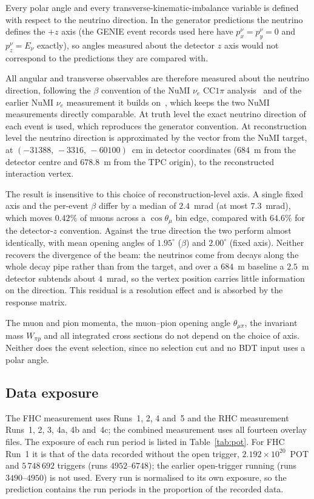 \documentclass[11pt,a4paper]{article}
\begin{document}
Every polar angle and every transverse-kinematic-imbalance variable is defined with respect to the
neutrino direction. In the generator predictions the neutrino defines the $+z$ axis (the GENIE
event records used here have $p_x^\nu=p_y^\nu=0$ and $p_z^\nu=E_\nu$ exactly), so angles measured
about the detector $z$ axis would not correspond to the predictions they are compared with.

All angular and transverse observables are therefore measured about the neutrino direction,
following the $\beta$ convention of the NuMI $\nu_e$ CC$1\pi$ analysis~\cite{numi_nue_ccpi} and of
the earlier NuMI $\nu_e$ measurement it builds on~\cite{mistry_thesis}, which keeps the two NuMI
measurements directly comparable. At truth level the exact neutrino direction of each event is
used, which reproduces the generator convention. At reconstruction level the neutrino direction is
approximated by the vector from the NuMI target, at $(-31388,\,-3316,\,-60100)$~cm in detector
coordinates ($684$~m from the detector centre and $678.8$~m from the TPC origin), to the
reconstructed interaction vertex.

The result is insensitive to this choice of reconstruction-level axis. A single fixed axis and the
per-event $\beta$ differ by a median of $2.4$~mrad (at most $7.3$~mrad), which moves $0.42\%$ of
muons across a $\cos\theta_\mu$ bin edge, compared with $64.6\%$ for the detector-$z$ convention.
Against the true direction the two perform almost identically, with mean opening angles of
$1.95^\circ$ ($\beta$) and $2.00^\circ$ (fixed axis). Neither recovers the divergence of the beam:
the neutrinos come from decays along the whole decay pipe rather than from the target, and over a
$684$~m baseline a $2.5$~m detector subtends about $4$~mrad, so the vertex position carries little
information on the direction. This residual is a resolution effect and is absorbed by the response
matrix.

The muon and pion momenta, the muon--pion opening angle $\theta_{\mu\pi}$, the invariant mass
$W_{\pi p}$ and all integrated cross sections do not depend on the choice of axis. Neither does the
event selection, since no selection cut and no BDT input uses a polar angle.

\subsection{Data exposure}

The FHC measurement uses Runs~1, 2, 4 and~5 and the RHC measurement Runs~1, 2, 3, 4a, 4b and~4c;
the combined measurement uses all fourteen overlay files. The exposure of each run period is listed
in Table~\ref{tab:pot}. For FHC Run~1 it is that of the data recorded without the open trigger,
$2.192\times10^{20}$~POT and $5\,748\,692$ triggers (runs $4952$--$6748$); the earlier open-trigger
running (runs $3490$--$4950$) is not used. Every run is normalised to its own exposure, so the
prediction contains the run periods in the proportion of the recorded data.
\end{document}
